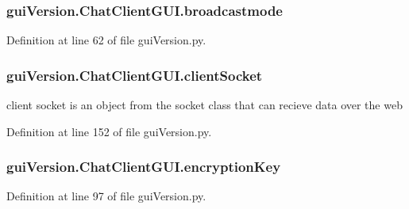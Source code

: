 \subsubsection[{broadcastmode}]{\setlength{\rightskip}{0pt plus 5cm}gui\+Version.\+Chat\+Client\+G\+U\+I.\+broadcastmode}\label{classgui_version_1_1_chat_client_g_u_i_a24c3049b3a6f498d56685eef5405baf6}


Definition at line 62 of file gui\+Version.\+py.

\hypertarget{classgui_version_1_1_chat_client_g_u_i_ad0d119fff1856994d498e1e9861451d5}{}
\subsubsection[{client\+Socket}]{\setlength{\rightskip}{0pt plus 5cm}gui\+Version.\+Chat\+Client\+G\+U\+I.\+client\+Socket}\label{classgui_version_1_1_chat_client_g_u_i_ad0d119fff1856994d498e1e9861451d5}


client socket is an object from the socket class that can recieve data over the web 



Definition at line 152 of file gui\+Version.\+py.

\hypertarget{classgui_version_1_1_chat_client_g_u_i_aafa39a201580f18372e0911d9667ccbd}{}
\subsubsection[{encryption\+Key}]{\setlength{\rightskip}{0pt plus 5cm}gui\+Version.\+Chat\+Client\+G\+U\+I.\+encryption\+Key}\label{classgui_version_1_1_chat_client_g_u_i_aafa39a201580f18372e0911d9667ccbd}


Definition at line 97 of file gui\+Version.\+py.

\hypertarget{classgui_version_1_1_chat_client_g_u_i_a61e070d785a0e8308bf1a26788075258}{}
